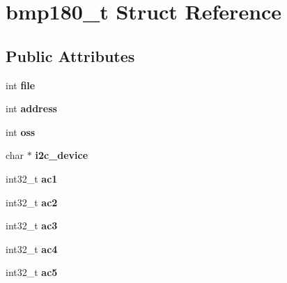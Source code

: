 \hypertarget{structbmp180__t}{\section{bmp180\+\_\+t Struct Reference}
\label{structbmp180__t}
}
\subsection*{Public Attributes}
\begin{DoxyCompactItemize}
\item 
\hypertarget{structbmp180__t_aa094c972f8437020ddafa15213b7f6a6}{int {\bfseries file}}\label{structbmp180__t_aa094c972f8437020ddafa15213b7f6a6}

\item 
\hypertarget{structbmp180__t_a762ab0331580b7f6ede5a4596b029a97}{int {\bfseries address}}\label{structbmp180__t_a762ab0331580b7f6ede5a4596b029a97}

\item 
\hypertarget{structbmp180__t_a696d18e25f197eb6bf8ce5f482df47db}{int {\bfseries oss}}\label{structbmp180__t_a696d18e25f197eb6bf8ce5f482df47db}

\item 
\hypertarget{structbmp180__t_a76cfc40f5647aeb0ab6f90178e7745a5}{char $\ast$ {\bfseries i2c\+\_\+device}}\label{structbmp180__t_a76cfc40f5647aeb0ab6f90178e7745a5}

\item 
\hypertarget{structbmp180__t_a5d10bcb25e6a90a15d7f7d9c79b21fd9}{int32\+\_\+t {\bfseries ac1}}\label{structbmp180__t_a5d10bcb25e6a90a15d7f7d9c79b21fd9}

\item 
\hypertarget{structbmp180__t_a566e7d7debb932fcf790721cc186ad16}{int32\+\_\+t {\bfseries ac2}}\label{structbmp180__t_a566e7d7debb932fcf790721cc186ad16}

\item 
\hypertarget{structbmp180__t_a53109b0c1c7780d5754f6762a6b46d31}{int32\+\_\+t {\bfseries ac3}}\label{structbmp180__t_a53109b0c1c7780d5754f6762a6b46d31}

\item 
\hypertarget{structbmp180__t_ad0d16f960d858cdca6eaf58c789cf840}{int32\+\_\+t {\bfseries ac4}}\label{structbmp180__t_ad0d16f960d858cdca6eaf58c789cf840}

\item 
\hypertarget{structbmp180__t_a5bcf5f73ec31f3806f7b36c883f5d012}{int32\+\_\+t {\bfseries ac5}}\label{structbmp180__t_a5bcf5f73ec31f3806f7b36c883f5d012}


\end{DoxyCompactItemize}
